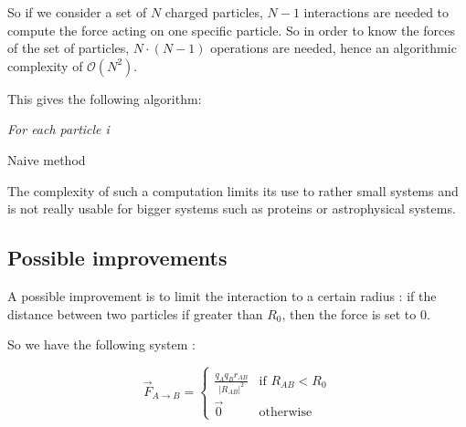 \documentclass[11pt,twoside,a4paper]{report}
\begin{document}
So if we consider a set of $N$ charged particles, $N-1$ interactions are needed to compute the force acting on one specific particle. So in order to know the forces of the set of particles, $N\cdot(N-1)$ operations are needed, hence an algorithmic complexity of $\mathcal{O}(N^2)$.

This gives the following algorithm:



\IncMargin{1em}
\begin{algorithm}[H]



\BlankLine

\emph{For each particle i}\;
\caption{Naive method}\label{algo_disjdecomp}
\end{algorithm}\DecMargin{1em}


The complexity of such a computation limits its use to rather small systems and is not really usable for bigger systems such as proteins or astrophysical systems.


\subsection{Possible improvements}

A possible improvement is to limit the interaction to a certain radius : if the distance between two particles if greater than $R_0$, then the force is set to $0$.

So we have the following system :


\begin{equation}
  \overrightarrow{F}_{A \rightarrow B}  =
	\begin{cases}
	  \frac{q_A q_B \hat{r}_{AB} }{|R_{AB}|^2}  & \text{if } R_{AB} < R_0 \\
	  \overrightarrow{0} & \text{otherwise}
	\end{cases}
\end{equation}
\end{document}
